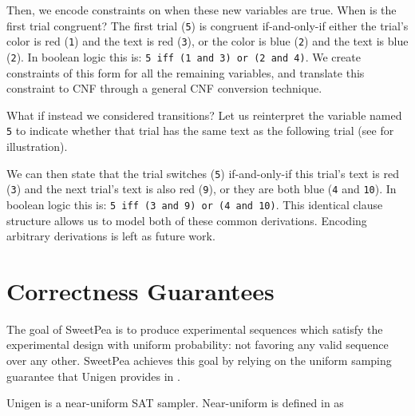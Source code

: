 Then, we encode constraints on when these new variables are true. When is the first trial congruent? The first trial (\texttt{5}) is congruent if-and-only-if either the trial's color is red (\texttt{1}) and the text is red (\texttt{3}), or the color is blue (\texttt{2}) and the text is blue (\texttt{2}). In boolean logic this is: \texttt{5 iff (1 and 3) or (2 and 4)}. We create constraints of this form for all the remaining variables, and translate this constraint to CNF through a general CNF conversion technique.

What if instead we considered transitions? Let us reinterpret the variable named \texttt{5} to indicate whether that trial has the same text as the following trial (see  for illustration).







We can then state that the trial switches (\texttt{5}) if-and-only-if this trial's text is red (\texttt{3}) and the next trial's text is also red (\texttt{9}), or they are both blue (\texttt{4} and \texttt{10}). In boolean logic this is: \texttt{5 iff (3 and 9) or (4 and 10)}. This identical clause structure allows us to model both of these common derivations. Encoding arbitrary derivations is left as future work.

\section{Correctness Guarantees}

The goal of SweetPea is to produce experimental sequences which satisfy the experimental design with uniform probability: not favoring any valid sequence over any other. SweetPea achieves this goal by relying on the uniform samping guarantee that Unigen provides in \cite{chakraborty2013scalable}.

Unigen is a near-uniform SAT sampler. Near-uniform is defined in \cite{meel2016constrained} as

